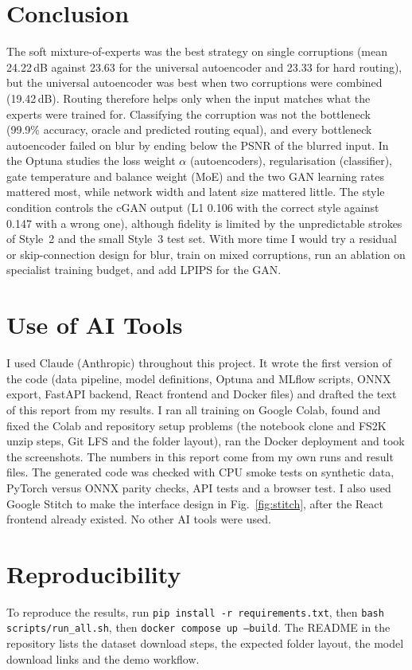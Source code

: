 \documentclass[journal,onecolumn,12pt,a4paper]{IEEEtran}
\let\oldsection\section
\renewcommand{\section}[1]{\oldsection{\textbf{#1}}}
\begin{document}
\section{Conclusion}
The soft mixture-of-experts was the best strategy on single corruptions (mean 24.22\,dB against 23.63 for the universal autoencoder and 23.33 for hard routing), but the universal autoencoder was best when two corruptions were combined (19.42\,dB). Routing therefore helps only when the input matches what the experts were trained for. Classifying the corruption was not the bottleneck (99.9\% accuracy, oracle and predicted routing equal), and every bottleneck autoencoder failed on blur by ending below the PSNR of the blurred input. In the Optuna studies the loss weight $\alpha$ (autoencoders), regularisation (classifier), gate temperature and balance weight (MoE) and the two GAN learning rates mattered most, while network width and latent size mattered little. The style condition controls the cGAN output (L1 0.106 with the correct style against 0.147 with a wrong one), although fidelity is limited by the unpredictable strokes of Style~2 and the small Style~3 test set. With more time I would try a residual or skip-connection design for blur, train on mixed corruptions, run an ablation on specialist training budget, and add LPIPS for the GAN.

\appendices
\section{Use of AI Tools}
I used Claude (Anthropic) throughout this project. It wrote the first version of the code (data pipeline, model definitions, Optuna and MLflow scripts, ONNX export, FastAPI backend, React frontend and Docker files) and drafted the text of this report from my results. I ran all training on Google Colab, found and fixed the Colab and repository setup problems (the notebook clone and FS2K unzip steps, Git LFS and the folder layout), ran the Docker deployment and took the screenshots. The numbers in this report come from my own runs and result files. The generated code was checked with CPU smoke tests on synthetic data, PyTorch versus ONNX parity checks, API tests and a browser test. I also used Google Stitch to make the interface design in Fig.~\ref{fig:stitch}, after the React frontend already existed. No other AI tools were used.

\section{Reproducibility}
To reproduce the results, run \texttt{pip install -r requirements.txt}, then \texttt{bash scripts/run\_all.sh}, then \texttt{docker compose up --build}. The README in the repository lists the dataset download steps, the expected folder layout, the model download links and the demo workflow.
\end{document}

